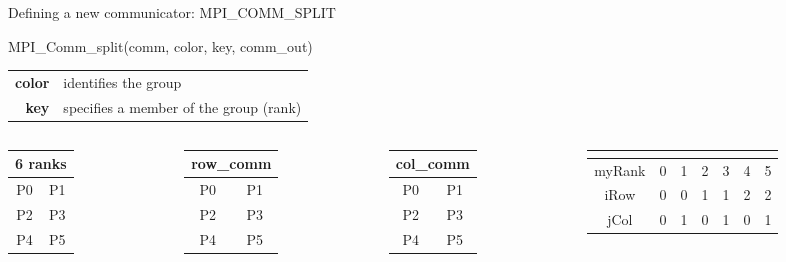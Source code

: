 \documentclass[aspectratio=43]{beamer}
\begin{document}
\begin{frame}[fragile]{Defining a new communicator: MPI\_COMM\_SPLIT}
\begin{Pseudolisting}[]{}
MPI_Comm_split(comm, color, key, comm_out)
\end{Pseudolisting}
\begin{black1block}{}
\begin{tabular}{rp{8cm}}
\textbf{color} & identifies the group\\
    \textbf{key} & specifies a member of the group (rank)\\
\end{tabular}
\end{black1block}
\begin{columns}
\begin{column}{0.2\paperwidth}
\begin{tabular}{|c|c|}
    \multicolumn{2}{c}{6 ranks} \\\hline
    P0 & P1 \\\hline
    P2 & P3 \\\hline
    P4 & P5 \\\hline
\end{tabular}
\end{column}
\begin{column}{0.2\paperwidth}
\begin{tabular}{|c|c|}
    \multicolumn{2}{c}{row\_comm} \\\hline
    \color{cscsred}P0 & \color{cscsred}P1 \\\hline
    \color{cscsgreen}P2 & \color{cscsgreen}P3 \\\hline
    \color{cscsblue}P4 & \color{cscsblue}P5 \\\hline
\end{tabular}
\end{column}
\begin{column}{0.19\paperwidth}
\begin{tabular}{|c|c|}
    \multicolumn{2}{c}{col\_comm} \\\hline
    \color{cscsred}P0 & \color{cscsblue}P1 \\\hline
    \color{cscsred}P2 & \color{cscsblue}P3 \\\hline
    \color{cscsred}P4 & \color{cscsblue}P5 \\\hline
\end{tabular}
\end{column}
\begin{column}{0.41\paperwidth}
\begin{tabular}{|c|c|c|c|c|c|c|}
    \multicolumn{7}{c}{} \\\hline
myRank & 0 & 1 & 2 & 3 & 4 & 5 \\\hline
iRow & 0 & 0 & 1 & 1 & 2 & 2 \\\hline
jCol & 0 & 1 & 0 & 1 & 0 & 1 \\\hline
\end{tabular}
\end{column}


\end{columns}
\end{frame}
\end{document}

